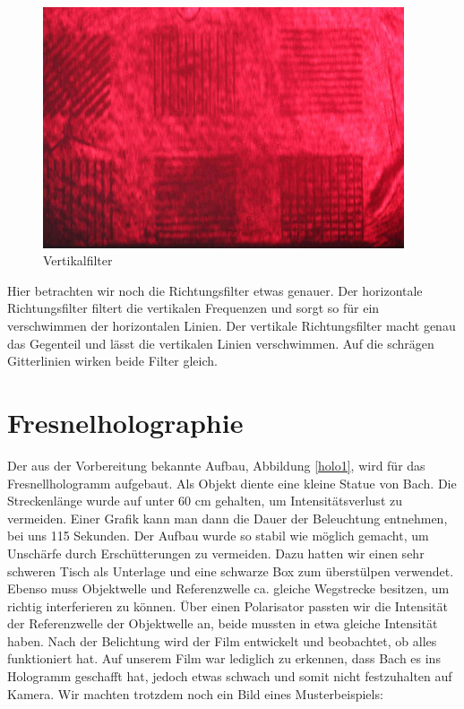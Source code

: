 \begin{figure}[H]
\begin{minipage}{0.33\textwidth}
                     \includegraphics[width=0.95\textwidth]{Abb/Abb_19.JPG} 
                     \caption{Vertikalfilter}
                  \end{minipage}
            \end{figure}

Hier betrachten wir noch die Richtungsfilter etwas genauer.
Der horizontale Richtungsfilter filtert die vertikalen Frequenzen und sorgt so für ein verschwimmen der horizontalen Linien. Der vertikale Richtungsfilter macht genau das Gegenteil und lässt die vertikalen Linien verschwimmen. Auf die schrägen Gitterlinien wirken beide Filter gleich.

    \section{Fresnelholographie}

Der aus der Vorbereitung bekannte Aufbau, Abbildung \ref{holo1}, wird für das Fresnellhologramm aufgebaut. Als Objekt diente eine kleine Statue von Bach. Die Streckenlänge wurde auf unter 60 cm gehalten, um Intensitätsverlust zu vermeiden. Einer Grafik kann man dann die Dauer der Beleuchtung entnehmen, bei uns 115 Sekunden. Der Aufbau wurde so stabil wie möglich gemacht, um Unschärfe durch Erschütterungen zu vermeiden. Dazu hatten wir einen sehr schweren Tisch als Unterlage und eine schwarze Box zum überstülpen verwendet. Ebenso muss Objektwelle und Referenzwelle ca. gleiche Wegstrecke besitzen, um richtig interferieren zu können. Über einen Polarisator passten wir die Intensität der Referenzwelle der Objektwelle an, beide mussten in etwa gleiche Intensität haben.
Nach der Belichtung wird der Film entwickelt und beobachtet, ob alles funktioniert hat. Auf unserem Film war lediglich zu erkennen, dass Bach es ins Hologramm geschafft hat, jedoch etwas schwach und somit nicht festzuhalten auf Kamera. Wir machten trotzdem noch ein Bild eines Musterbeispiels:

